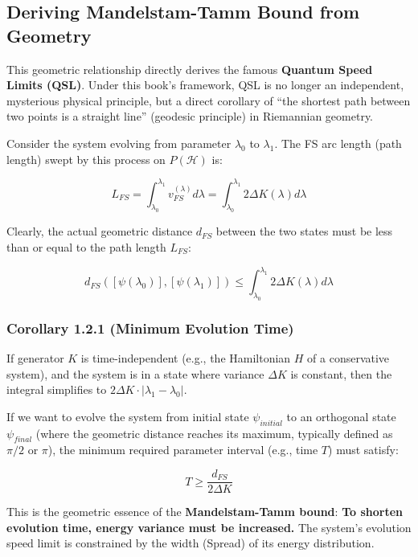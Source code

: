 \subsection{Deriving Mandelstam-Tamm Bound from Geometry}

This geometric relationship directly derives the famous \textbf{Quantum Speed Limits (QSL)}. Under this book's framework, QSL is no longer an independent, mysterious physical principle, but a direct corollary of ``the shortest path between two points is a straight line'' (geodesic principle) in Riemannian geometry.

Consider the system evolving from parameter \textbf{$\lambda_0$} to \textbf{$\lambda_1$}. The FS arc length (path length) swept by this process on \textbf{$P(\mathcal{H})$} is:

$$L_{FS} = \int_{\lambda_0}^{\lambda_1} v_{FS}^{(\lambda)} d\lambda = \int_{\lambda_0}^{\lambda_1} 2\Delta K(\lambda) d\lambda$$

Clearly, the actual geometric distance \textbf{$d_{FS}$} between the two states must be less than or equal to the path length \textbf{$L_{FS}$}:

$$d_{FS}([\psi(\lambda_0)], [\psi(\lambda_1)]) \le \int_{\lambda_0}^{\lambda_1} 2\Delta K(\lambda) d\lambda$$

\subsubsection{Corollary 1.2.1 (Minimum Evolution Time)}

If generator \textbf{$K$} is time-independent (e.g., the Hamiltonian \textbf{$H$} of a conservative system), and the system is in a state where variance \textbf{$\Delta K$} is constant, then the integral simplifies to \textbf{$2\Delta K \cdot |\lambda_1 - \lambda_0|$}.

If we want to evolve the system from initial state \textbf{$\psi_{initial}$} to an orthogonal state \textbf{$\psi_{final}$} (where the geometric distance reaches its maximum, typically defined as \textbf{$\pi/2$} or \textbf{$\pi$}), the minimum required parameter interval (e.g., time \textbf{$T$}) must satisfy:

$$T \ge \frac{d_{FS}}{2\Delta K}$$

This is the geometric essence of the \textbf{Mandelstam-Tamm bound}: \textbf{To shorten evolution time, energy variance must be increased.} The system's evolution speed limit is constrained by the width (Spread) of its energy distribution.

